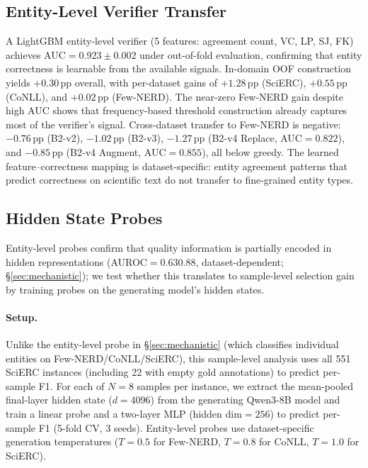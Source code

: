 \subsection{Entity-Level Verifier Transfer}\label{app:verifier_transfer}

A LightGBM entity-level verifier (5 features: agreement count, VC, LP, SJ, FK) achieves AUC${=}0.923{\pm}0.002$ under out-of-fold evaluation, confirming that entity correctness is learnable from the available signals.
In-domain OOF construction yields $+0.30$\,pp overall, with per-dataset gains of $+1.28$\,pp (SciERC), $+0.55$\,pp (CoNLL), and $+0.02$\,pp (Few-NERD).
The near-zero Few-NERD gain despite high AUC shows that frequency-based threshold construction already captures most of the verifier's signal.
Cross-dataset transfer to Few-NERD is negative: $-0.76$\,pp (B2-v2), $-1.02$\,pp (B2-v3), $-1.27$\,pp (B2-v4 Replace, AUC${=}0.822$), and $-0.85$\,pp (B2-v4 Augment, AUC${=}0.855$), all below greedy.
The learned feature--correctness mapping is dataset-specific: entity agreement patterns that predict correctness on scientific text do not transfer to fine-grained entity types.

\subsection{Hidden State Probes}\label{app:hidden_probe}

Entity-level probes confirm that quality information is partially encoded in hidden representations (AUROC${=}0.63$\textendash$0.88$, dataset-dependent; \S\ref{sec:mechanistic}); we test whether this translates to sample-level selection gain by training probes on the generating model's hidden states.

\paragraph{Setup.}
Unlike the entity-level probe in \S\ref{sec:mechanistic} (which classifies individual entities on Few-NERD/CoNLL/SciERC), this sample-level analysis uses all 551 SciERC instances (including 22 with empty gold annotations) to predict per-sample F1.
For each of $N{=}8$ samples per instance, we extract the mean-pooled final-layer hidden state ($d{=}4096$) from the generating Qwen3-8B model and train a linear probe and a two-layer MLP (hidden dim${=}256$) to predict per-sample F1 (5-fold CV, 3 seeds).
Entity-level probes use dataset-specific generation temperatures ($T{=}0.5$ for Few-NERD, $T{=}0.8$ for CoNLL, $T{=}1.0$ for SciERC).

